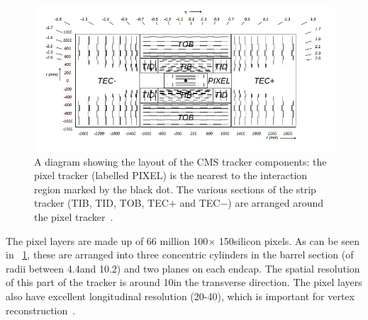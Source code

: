 

\begin{figure}[h]
\centering
\includegraphics[width=1.0\textwidth]{detectorFigures/trackerSchematic.png}
\caption[A diagram showing the layout of the CMS tracker components: the pixel tracker (labelled PIXEL) is the nearest to the interaction region marked by the black dot. The various sections of the strip tracker (TIB, TID, TOB, TEC$+$ and TEC$-$) are arranged around the pixel tracker\quad\cite{CMSTDR}.]{A diagram showing the layout of the CMS tracker components: the pixel tracker (labelled PIXEL) is the nearest to the interaction region marked by the black dot. The various sections of the strip tracker (TIB, TID, TOB, TEC$+$ and TEC$-$) are arranged around the pixel tracker~\cite{CMSTDR}.}
\label{fig:trk}
\end{figure}

The pixel layers are made up of 66 million 100\um $\times$ 150\um silicon pixels. As can be seen in \Fig~\ref{fig:trk}, these are arranged into three concentric cylinders in the barrel section (of radii between 4.4\cm and 10.2\cm) and two planes on each endcap. The spatial resolution of this part of the tracker is around 10\um in the transverse direction. The pixel layers also have excellent longitudinal resolution (20-40\um), which is important for vertex reconstruction~\cite{trackerperformance2014}.

